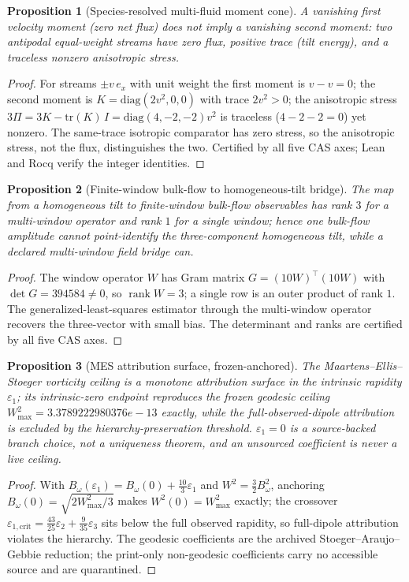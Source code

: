 \documentclass[11pt]{article}
\newtheorem{proposition}{Proposition}
\begin{document}
\begin{proposition}[Species-resolved multi-fluid moment cone]
\label{prop:multifluid}
A vanishing first velocity moment (zero net flux) does not imply a vanishing
second moment: two antipodal equal-weight streams have zero flux, positive
trace (tilt energy), and a traceless nonzero anisotropic stress.
\end{proposition}
\begin{proof}
For streams $\pm v\,e_x$ with unit weight the first moment is
$v-v=0$; the second moment is $K=\mathrm{diag}(2v^2,0,0)$ with trace $2v^2>0$;
the anisotropic stress $3\Pi=3K-\mathrm{tr}(K)\,I=\mathrm{diag}(4,-2,-2)v^2$ is
traceless ($4-2-2=0$) yet nonzero. The same-trace isotropic comparator has zero
stress, so the anisotropic stress, not the flux, distinguishes the two. Certified
by all five CAS axes; Lean and Rocq verify the integer identities.
\end{proof}

\begin{proposition}[Finite-window bulk-flow to homogeneous-tilt bridge]
\label{prop:bridge}
The map from a homogeneous tilt to finite-window bulk-flow observables has rank
$3$ for a multi-window operator and rank $1$ for a single window; hence one
bulk-flow amplitude cannot point-identify the three-component homogeneous tilt,
while a declared multi-window field bridge can.
\end{proposition}
\begin{proof}
The window operator $W$ has Gram matrix $G=(10W)^\top(10W)$ with
$\det G=394584\neq0$, so $\operatorname{rank}W=3$; a single row is an outer
product of rank $1$. The generalized-least-squares estimator through the
multi-window operator recovers the three-vector with small bias. The determinant
and ranks are certified by all five CAS axes.
\end{proof}

\begin{proposition}[MES attribution surface, frozen-anchored]
\label{prop:mes}
The Maartens--Ellis--Stoeger vorticity ceiling is a monotone attribution surface
in the intrinsic rapidity $\varepsilon_1$; its intrinsic-zero endpoint reproduces
the frozen geodesic ceiling $W^2_{\max}=3.3789222980376e-13$ exactly, while the
full-observed-dipole attribution is excluded by the hierarchy-preservation
threshold. $\varepsilon_1=0$ is a source-backed branch choice, not a uniqueness
theorem, and an unsourced coefficient is never a live ceiling.
\end{proposition}
\begin{proof}
With $B_\omega(\varepsilon_1)=B_\omega(0)+\tfrac{10}{3}\varepsilon_1$ and
$W^2=\tfrac32 B_\omega^2$, anchoring $B_\omega(0)=\sqrt{2W^2_{\max}/3}$ makes
$W^2(0)=W^2_{\max}$ exactly; the crossover
$\varepsilon_{1,\mathrm{crit}}=\tfrac{43}{25}\varepsilon_2+\tfrac{9}{35}\varepsilon_3$
sits below the full observed rapidity, so full-dipole attribution violates the
hierarchy. The geodesic coefficients are the archived Stoeger--Araujo--Gebbie
reduction; the print-only non-geodesic coefficients carry no accessible source
and are quarantined.
\end{proof}
\end{document}

